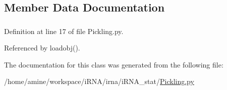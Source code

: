 \subsection{\-Member \-Data \-Documentation}
\hypertarget{classirna_1_1iRNA__stat_1_1Pickling_1_1Pickling_a713b6ebe141dc555ad6abf22940c4c74}{
\subsubsection[{path}]{}}
\label{classirna_1_1iRNA__stat_1_1Pickling_1_1Pickling_a713b6ebe141dc555ad6abf22940c4c74}


\-Definition at line 17 of file \-Pickling.\-py.



\-Referenced by loadobj().



\-The documentation for this class was generated from the following file\-:\begin{DoxyCompactItemize}
\item 
/home/amine/workspace/i\-R\-N\-A/irna/i\-R\-N\-A\-\_\-stat/\hyperlink{Pickling_8py}{\-Pickling.\-py}\end{DoxyCompactItemize}
